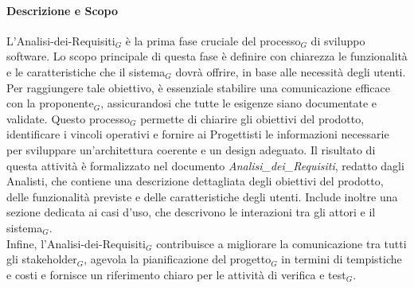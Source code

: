 \documentclass[10pt]{article}
\begin{document}
\begin{justify}
        \paragraph{Descrizione e Scopo}
        L'Analisi-dei-Requisiti$_G$ è la prima fase cruciale del processo$_G$ di sviluppo software. Lo scopo principale di questa fase è definire con chiarezza le funzionalità e le caratteristiche che il sistema$_G$ dovrà offrire, in base alle necessità degli utenti. Per raggiungere tale obiettivo, è essenziale stabilire una comunicazione efficace con la proponente$_G$, assicurandosi che tutte le esigenze siano documentate e validate. Questo processo$_G$ permette di chiarire gli obiettivi del prodotto, identificare i vincoli operativi e fornire ai Progettisti le informazioni necessarie per sviluppare un'architettura coerente e un design adeguato. Il risultato di questa attività è formalizzato nel documento \textit{Analisi\_dei\_Requisiti}, redatto dagli Analisti, che contiene una descrizione dettagliata degli obiettivi del prodotto, delle funzionalità previste e delle caratteristiche degli utenti. Include inoltre una sezione dedicata ai casi d'uso, che descrivono le interazioni tra gli attori e il sistema$_G$.\\
        Infine, l'Analisi-dei-Requisiti$_G$ contribuisce a migliorare la comunicazione tra tutti gli stakeholder$_G$, agevola la pianificazione del progetto$_G$ in termini di tempistiche e costi e fornisce un riferimento chiaro per le attività di verifica e test$_G$.\\


\end{justify}
\end{document}

